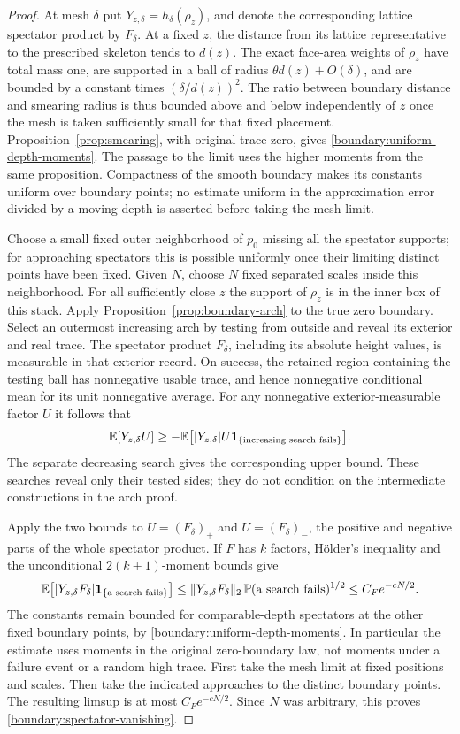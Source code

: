 \begin{proof}
At mesh $\delta$ put $Y_{z,\delta}=h_\delta(\rho_z)$, and denote the
corresponding lattice spectator product by $F_\delta$.
At a fixed $z$, the distance from its lattice representative to the
prescribed skeleton tends to $d(z)$.  The exact face-area weights
of $\rho_z$ have total mass one, are supported in a ball of radius
$\theta d(z)+O(\delta)$, and are bounded by a constant times
$(\delta/d(z))^2$.  The ratio between boundary distance and smearing
radius is thus bounded above and below independently of $z$ once
the mesh is taken sufficiently small for that fixed placement.
Proposition~\ref{prop:smearing}, with original trace zero, gives
\eqref{boundary:uniform-depth-moments}.  The passage to the limit
uses the higher moments from the same proposition.  Compactness
of the smooth boundary makes its constants uniform over boundary
points; no estimate uniform in the approximation error divided by
a moving depth is asserted before taking the mesh limit.

Choose a small fixed outer neighborhood of $p_0$ missing all the
spectator supports; for approaching spectators this is possible
uniformly once their limiting distinct points have been fixed.
Given $N$, choose $N$ fixed separated scales inside this neighborhood.
For all sufficiently close $z$ the support of $\rho_z$ is in the
inner box of this stack.  Apply
Proposition~\ref{prop:boundary-arch} to the true zero boundary.
Select an outermost increasing arch by testing from outside and
reveal its exterior and real trace.  The spectator product $F_\delta$,
including its absolute height values, is measurable in that exterior
record.  On success, the retained region containing the testing
ball has nonnegative usable trace, and hence nonnegative conditional
mean for its unit nonnegative average.  For any nonnegative
exterior-measurable factor $U$ it follows that
\[
 \mathbb E[Y_{z,\delta}U]
 \ge -\mathbb E\big[|Y_{z,\delta}|U\mathbf 1_{\{\text{increasing search fails}\}}\big].
\]
The separate decreasing search gives the corresponding upper bound.
These searches reveal only their tested sides; they do not
condition on the intermediate constructions in the arch proof.

Apply the two bounds to $U=(F_\delta)_+$ and $U=(F_\delta)_-$, the positive and
negative parts of the whole spectator product.  If $F$ has $k$
factors, H\"older's inequality and the unconditional
$2(k+1)$-moment bounds give
\[
 \mathbb E\big[|Y_{z,\delta}F_\delta|\mathbf 1_{\{\text{a search fails}\}}\big]
 \le \|Y_{z,\delta}F_\delta\|_2\,
       \mathbb P(\text{a search fails})^{1/2}
 \le C_F e^{-cN/2}.
\]
The constants remain bounded for comparable-depth spectators at
the other fixed boundary points, by
\eqref{boundary:uniform-depth-moments}.  In particular the estimate
uses moments in the original zero-boundary law, not moments under
a failure event or a random high trace.  First take the mesh limit
at fixed positions and scales.  Then take the indicated approaches
to the distinct boundary points.  The resulting limsup is at most
$C_F e^{-cN/2}$.  Since $N$ was arbitrary, this proves
\eqref{boundary:spectator-vanishing}.


\end{proof}
